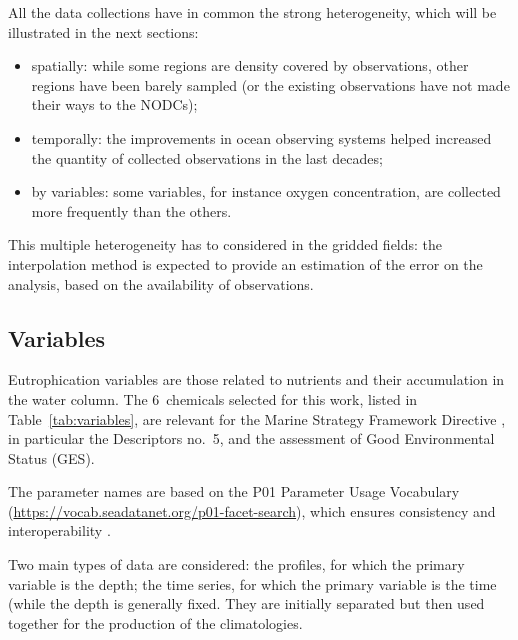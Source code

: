 \documentclass[essd, manuscript]{copernicus}
\begin{document}
All the data collections have in common the strong heterogeneity, which will be illustrated in the next sections: 
\begin{itemize}
\item spatially: while some regions are density covered by observations, other regions have been barely sampled (or the existing observations have not made their ways to the NODCs);
\item temporally: the improvements in ocean observing systems helped increased the quantity of collected observations in the last decades;
\item by variables: some variables, for instance oxygen concentration, are collected more frequently than the others.
\end{itemize}
This multiple heterogeneity has to considered in the gridded fields: the interpolation method is expected to provide an estimation of the error on the analysis, based on the availability of observations. 


\subsection{Variables\label{sec:variables}}

Eutrophication variables are those related to nutrients and their accumulation in the water column. The 6~chemicals selected for this work, listed in Table~\ref{tab:variables}, are relevant for the Marine Strategy Framework Directive \citep[MSFD,][]{EURO2008}, in particular the Descriptors no.~5, and the assessment of Good Environmental Status (GES). 

The parameter names are based on the P01 Parameter Usage Vocabulary (\url{https://vocab.seadatanet.org/p01-facet-search}), which ensures consistency and interoperability \citep{iocmanualsguides54}. 

Two main types of data are considered: the profiles, for which the primary variable is the depth; the time series, for which the primary variable is the time (while the depth is generally fixed. They are initially separated but then used together for the production of the climatologies. 
\end{document}

